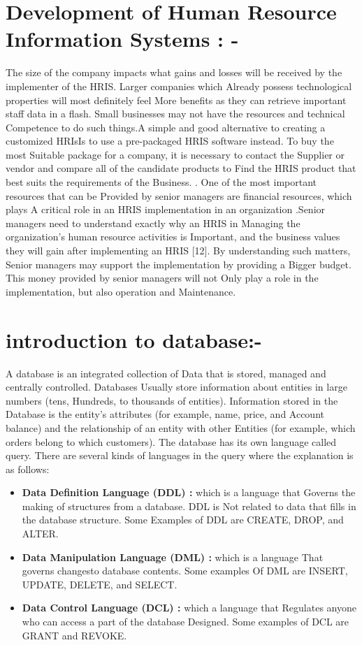\documentclass[12pt,a4paper]{article}
\begin{document}
\section*{Development of Human Resource Information Systems : -}The size of the company impacts what gains and losses will be received by the implementer of the HRIS. Larger companies which Already possess technological properties will most definitely feel More benefits as they can retrieve important staff data in a flash.
Small businesses may not have the resources and technical Competence to do such things.A simple and good alternative to creating a customized HRIsIs to use a pre-packaged HRIS software instead. To buy the most Suitable package for a company, it is necessary to contact the Supplier or vendor and compare all of the candidate products to Find the HRIS product that best suits the requirements of the Business.
. One of the most important resources that can be Provided by senior managers are financial resources, which plays A critical role in an HRIS implementation in an organization .Senior managers need to understand exactly why an HRIS in Managing the organization’s human resource activities is Important, and the business values they will gain after implementing an HRIS [12]. By understanding such matters, Senior managers may support the implementation by providing a Bigger budget. This money provided by senior managers will not Only play a role in the implementation, but also operation and Maintenance.
\section*{introduction to database:-} A database is an integrated collection of Data that is stored, managed and centrally controlled. Databases Usually store information about entities in large numbers (tens, Hundreds, to thousands of entities). Information stored in the Database is the entity’s attributes (for example, name, price, and Account balance) and the relationship of an entity with other Entities (for example, which orders belong to which customers). The database has its own language called query. 
There are several kinds of languages in the query where the explanation is as follows:
\begin{itemize}
    \item \textbf{Data Definition Language (DDL) : }which is a language that Governs the making of structures from a database. DDL is Not related to data that fills in the database structure. Some Examples of DDL are CREATE, DROP, and ALTER.
\item \textbf{Data Manipulation Language (DML) : }which is a language That governs changesto database contents. Some examples Of DML are INSERT, UPDATE, DELETE, and SELECT.
\item \textbf{Data Control Language (DCL) : }which a language that Regulates anyone who can access a part of the database Designed. Some examples of DCL are GRANT and REVOKE.
\end{itemize} 
\end{document}
